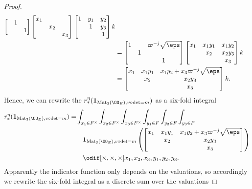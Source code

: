 \begin{proof}
\begin{align*}
\begin{bmatrix}
      & 1 \\
      &   & 1
    \end{bmatrix}
    \begin{bmatrix} x_1 \\ & x_2 \\ && x_3 \end{bmatrix}
    \begin{bmatrix} 1 & y_1 & y_2 \\ & 1 & y_3 \\ & & 1 \end{bmatrix} k \\
    &=
    \begin{bmatrix}
      1 &   & \varpi^{-j}\sqrt\eps \\
      & 1 \\
      &   & 1
    \end{bmatrix}
    \begin{bmatrix} x_1 & x_1 y_1 & x_1 y_2 \\ & x_2 & x_2 y_3 \\ & & x_3 \end{bmatrix} k \\
    &=
    \begin{bmatrix}
      x_1 & x_1 y_1 & x_1 y_2 + x_3 \varpi^{-j} \sqrt\eps \\
      & x_2 & x_2 y_3 \\
      & & x_3
    \end{bmatrix}
    k.
  \end{align*}
  Hence, we can rewrite the $r_\ast^\eta(\mathbf{1}_{\Mat_3(\OO_E), v\circ\det=m})$
  as a six-fold integral
  \begin{align*}
    r_\ast^\eta(\mathbf{1}_{\Mat_3(\OO_E), v\circ\det=m}) =
    & \int_{x_1 \in F^\times} \int_{x_2 \in F^\times} \int_{x_3 \in F^\times}
    \int_{y_1 \in F} \int_{y_2 \in F} \int_{y_3 \in F} \\
    &\quad \mathbf{1}_{\Mat_3(\OO_E), v\circ\det=m} \left(
    \begin{bmatrix}
      x_1 & x_1 y_1 & x_1 y_2 + x_3 \varpi^{-j} \sqrt\eps \\
      & x_2 & x_2 y_3 \\
      & & x_3
    \end{bmatrix}
    \right) \\
    &\quad \odif[{\times,\times,\times}]{x_1,x_2,x_3,y_1,y_2,y_3}.
  \end{align*}
  Apparently the indicator function only depends on the valuations,
  so accordingly we rewrite the six-fold integral as a discrete sum over the valuations

\end{proof}
